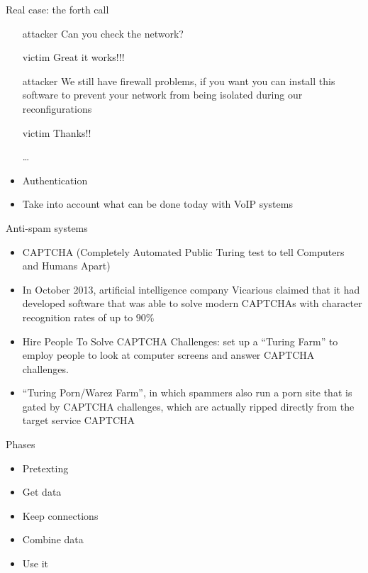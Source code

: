 \documentclass{beamer}
\begin{document}
\begin{frame}{Real case: the forth call}
  \begin{itemize}
    \item[attacker] Can you check the network?
    \item[victim] Great it works!!!
    \item[attacker] We still have firewall problems, if you want you
      can install this software to prevent your network from being
      isolated during our reconfigurations 
    \item[victim] Thanks!!
    \item[\dots] 
    \item Authentication
    \item Take into account what can be done today with VoIP systems
  \end{itemize}
\end{frame}

\begin{frame}{Anti-spam systems}
  \begin{itemize}
    \item CAPTCHA (Completely Automated Public Turing test to tell
      Computers and Humans Apart)
    \item In October 2013, artificial intelligence company Vicarious
      claimed that it had developed software that was able to solve
      modern CAPTCHAs with character recognition rates of up to $90\%$
    \item<2-> Hire People To Solve CAPTCHA Challenges: 
set up a ``Turing Farm'' to
employ people to look at computer screens and answer CAPTCHA
challenges. 
\item<3-> ``Turing Porn/Warez Farm'', in which spammers also run a porn site that is
  gated by CAPTCHA challenges, which are actually ripped directly from
  the target service CAPTCHA
  \end{itemize}
\end{frame}

\begin{frame}{Phases}
  \begin{itemize}
    \item Pretexting
    \item Get data
    \item Keep connections
    \item Combine data
    \item Use it
  \end{itemize}
\end{frame}
\end{document}
